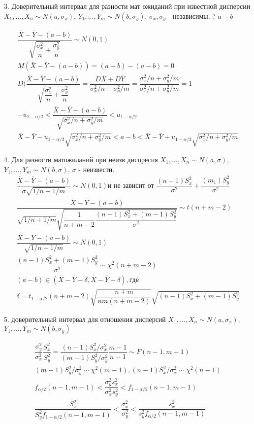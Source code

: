 3. Доверительный интервал для разности мат ожиданий при известной дисперсии
$X_1, \dots, X_n \sim N(a, \sigma_x)$, $Y_1, \dots, Y_m \sim N(b, \sigma_y)$, $\sigma_x, \sigma_y$ - независимы.
? $a-b$

\begin{multline*}
  \dfrac{\bar X - \bar Y - (a-b)}{\sqrt{\dfrac{\sigma_x^2}{n} + \dfrac{\sigma_y^2}{n}}} \sim N(0, 1) \\
  M(\bar X - \bar Y - (a-b)) = (a-b) - (a-b) = 0 \\
  D(\dfrac{\bar X - \bar Y - (a-b)}{\sqrt{\dfrac{\sigma_x^2}{n} + \dfrac{\sigma_y^2}{n}}} = \dfrac{D \bar X + D \bar Y}{\sigma_x^2 / n + \sigma_y^2 / m} = \dfrac{\sigma_x^2 / n + \sigma_y^2 / m}{\sigma_x^2 / n + \sigma_y^2 / m} = 1 \\
  - u_{1-\alpha/2} < \dfrac{\bar X - \bar Y - (a-b)}{\sqrt{\sigma_x^2 / n + \sigma_y^2 / m}} < u_{1-\alpha/2} \\
  \bar X - \bar Y - u_{1-\alpha/2} \sqrt{\sigma_x^2 / n + \sigma_y^2 / m}< a-b < \bar X - \bar Y + u_{1-\alpha/2} \sqrt{\sigma_x^2 / n + \sigma_y^2 / m} 
\end{multline*}

4. Для разности матожиланий при неизв диспресия
$X_1, \dots, X_n \sim N(a, \sigma)$, $Y_1, \dots, Y_m \sim N(b, \sigma)$, $\sigma$ - неизвестн.
\begin{multline*}
  \dfrac{\bar X - \bar Y - (a-b)}{\sigma \sqrt{1/n + 1/m}} \sim N(0, 1) \text{и не зависит от $\dfrac{(n-1)S_x^2}{\sigma^2} + \dfrac{(m_1) S_y^2}{\sigma^2}$} \\
  \dfrac{\bar X - \bar Y - (a-b)}{\sqrt{1/n + 1/m} \sqrt{\dfrac{1}{n+m-2} \dfrac{(n-1) S_x^2 + (m-1)S_y^2}{\sigma^2}}} \sim t(n+m-2)\\
\dfrac{\bar X - \bar Y - (a-b)}{\sqrt{1/n + 1/m}} \sim N(0, 1) \\
\dfrac{(n-1) S_x^2 + (m-1)S_y^2}{\sigma^2} \sim \chi^2(n+m-2) \\
(a-b) \in (\bar X - \bar Y - \delta, \bar X - \bar Y + \delta), где \\
\delta = t_{1-\alpha/2} (n+m-2) \sqrt{\dfrac{n+m}{nm(n+m-2)}} \sqrt{(n-1)S_x^2 + (m-1) S_y^2}
\end{multline*}

5. доверительный интервал для отношения дисперсий
$X_1, \dots, X_n \sim N(a, \sigma_x)$, $Y_1, \dots, Y_m \sim N(b, \sigma_y)$

\begin{multline*}
  \dfrac{\sigma_y^2}{\sigma_x^2} \dfrac{S_x^2}{S_y^2} = \dfrac{(n-1) S_x^2 / \sigma_x^2}{(m-1) S_y^2 / \sigma_y^2} \dfrac{m-1}{n-1} \sim F(n-1, m-1) \\
(m-1) S_y^2 / \sigma_y^2 \sim \chi^2(m-1), (n-1) S_x^2 / \sigma_x^2 \sim \chi^2(n-1) \\
f_{\alpha/2} (n-1, m-1) < \dfrac{\sigma_y^2 s_x^2}{\sigma_x^2 s_y^2} < f_{1-\alpha/2} (n-1, m-1) \\
\dfrac{S_x^2}{S_y^2 f_{1-\alpha/2} (n-1, m-1)} < \dfrac{\sigma_x^2}{\sigma_y^2} < \dfrac{s_x^2}{s_y^2 f_{\alpha/2} (n-1, m-1)}
\end{multline*}

